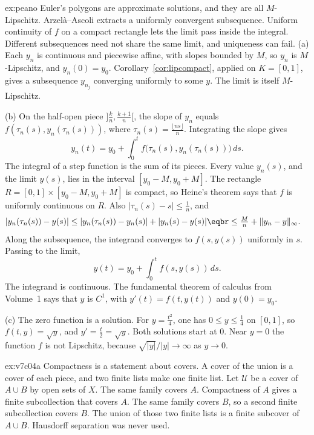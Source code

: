 \begin{solution}{ex:peano}
\idea Euler's polygons are approximate solutions, and they are all $M$-Lipschitz. Arzel\`a--Ascoli extracts a uniformly convergent subsequence. Uniform continuity of $f$ on a compact rectangle lets the limit pass inside the integral. Different subsequences need not share the same limit, and uniqueness can fail.
\writeup (a) Each $y_n$ is continuous and piecewise affine, with slopes bounded by $M$, so $y_n$ is $M$-Lipschitz, and $y_n(0)=y_0$. Corollary~\ref{cor:lipcompact}, applied on $K=[0,1]$, gives a subsequence $y_{n_j}$ converging uniformly to some $y$. The limit is itself $M$-Lipschitz.

(b) On the half-open piece $]\frac kn,\frac{k+1}n[$, the slope of $y_n$ equals $f(\tau_n(s),y_n(\tau_n(s)))$, where $\tau_n(s)=\frac{\lfloor ns\rfloor}n$. Integrating the slope gives
\[y_n(t)=y_0+\int_0^t f\bigl(\tau_n(s),y_n(\tau_n(s))\bigr)\,ds.\]
The integral of a step function is the sum of its pieces. Every value $y_n(s)$, and the limit $y(s)$, lies in the interval $[y_0-M,y_0+M]$. The rectangle $R=[0,1]\times[y_0-M,y_0+M]$ is compact, so Heine's theorem says that $f$ is uniformly continuous on $R$. Also $|\tau_n(s)-s|\le\frac1n$, and
\[\begin{aligned}|y_n(\tau_n(s))-y(s)|&\le|y_n(\tau_n(s))-y_n(s)|+|y_n(s)-y(s)|\eqbr\le\tfrac Mn+\|y_n-y\|_\infty.\end{aligned}\]
Along the subsequence, the integrand converges to $f(s,y(s))$ uniformly in $s$. Passing to the limit,
\[y(t)=y_0+\int_0^t f(s,y(s))\,ds.\]
The integrand is continuous. The fundamental theorem of calculus from Volume~1 says that $y$ is $C^1$, with $y'(t)=f(t,y(t))$ and $y(0)=y_0$.

(c) The zero function is a solution. For $y=\frac{t^2}4$, one has $0\le y\le\frac14$ on $[0,1]$, so $f(t,y)=\sqrt y$, and $y'=\frac t2=\sqrt y$. Both solutions start at $0$. Near $y=0$ the function $f$ is not Lipschitz, because $\sqrt{|y|}/|y|\to\infty$ as $y\to0$.
\end{solution}

\begin{solution}{ex:v7c04a}
\idea Compactness is a statement about covers. A cover of the union is a cover of each piece, and two finite lists make one finite list.
\writeup Let $\mathcal U$ be a cover of $A\cup B$ by open sets of $X$. The same family covers $A$. Compactness of $A$ gives a finite subcollection that covers $A$. The same family covers $B$, so a second finite subcollection covers $B$. The union of those two finite lists is a finite subcover of $A\cup B$. Hausdorff separation was never used.
\end{solution}

